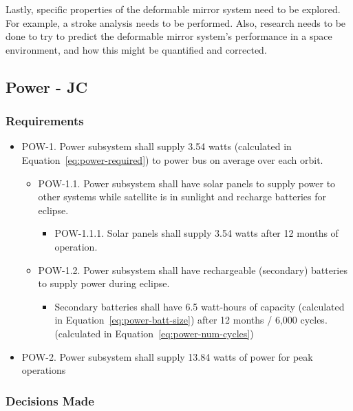 \documentclass[12pt]{article}
\begin{document}
Lastly, specific properties of the deformable mirror system need to be explored.  For example, a stroke analysis needs to be performed.  Also, research needs to be done to try to predict the deformable mirror system's performance in a space environment, and how this might be quantified and corrected.

\newpage
\FloatBarrier
			
		\subsection{Power - JC}
			\subsubsection{Requirements}
			
			\begin{itemize}
				\item POW-1.  Power subsystem shall supply 3.54 watts (calculated in Equation~\ref{eq:power-required}) to power bus on average over each orbit.
				\begin{itemize}
					\item POW-1.1.  Power subsystem shall have solar panels to supply power to other systems while satellite is in sunlight and recharge batteries for eclipse.
					\begin{itemize}
						\item POW-1.1.1.  Solar panels shall supply 3.54 watts after 12 months of operation.
					\end{itemize}
					\item POW-1.2.  Power subsystem shall have rechargeable (secondary) batteries to supply power during eclipse.
					\begin{itemize}
						\item Secondary batteries shall have 6.5 watt-hours of capacity (calculated in Equation~\ref{eq:power-batt-size}) after 12 months / 6,000 cycles. (calculated in Equation~\ref{eq:power-num-cycles})
					\end{itemize}
				\end{itemize}
				\item POW-2.  Power subsystem shall supply 13.84 watts of power for peak operations
			\end{itemize}
			
			\subsubsection{Decisions Made}
			
\end{document}
